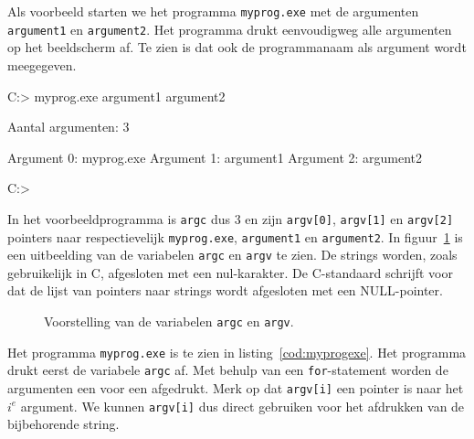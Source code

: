 Als voorbeeld starten we het programma \texttt{myprog.exe} met de argumenten \texttt{argument1} en \texttt{argument2}. Het programma drukt eenvoudigweg alle argumenten op het beeldscherm af. Te zien is dat ook de programmanaam als argument wordt meegegeven.

\begin{dosbox}[title=Afdrukken van programmanaam en argumenten.,label=fig:poiargcv]
C:\Users\C> myprog.exe argument1 argument2

Aantal argumenten: 3

Argument 0: myprog.exe
Argument 1: argument1
Argument 2: argument2

C:\Users\C>
\end{dosbox}

In het voorbeeldprogramma is \texttt{argc} dus 3 en zijn \texttt{argv[0]}, \texttt{argv[1]} en \texttt{argv[2]} pointers naar respectievelijk \texttt{myprog.exe}, \texttt{argument1} en \texttt{argument2}. In figuur~\ref{fig:poiargcargv} is een uitbeelding van de variabelen \texttt{argc} en \texttt{argv} te zien. De strings worden, zoals gebruikelijk in C,  afgesloten met een nul-karakter. De C-standaard schrijft voor dat de lijst van pointers naar strings wordt afgesloten met een NULL-pointer.

\begin{figure}[!ht]
\centering
{}
\caption{Voorstelling van de variabelen \texttt{argc} en \texttt{argv}.}
\label{fig:poiargcargv}
\end{figure}

Het programma \texttt{myprog.exe} is te zien in listing~\ref{cod:myprogexe}. Het
programma drukt eerst de variabele \texttt{argc} af. Met behulp van een \texttt{for}-statement
worden de argumenten een voor een afgedrukt. Merk op dat \texttt{argv[i]} een
pointer is naar het $i^e$ argument. We kunnen \texttt{argv[i]} dus direct gebruiken
voor het afdrukken van de bijbehorende string.

